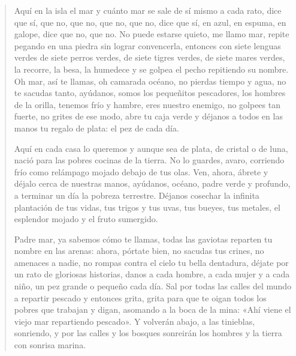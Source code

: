 \documentclass[12pt]{article}
\begin{document}
\clearpage
{}
\begin{verse}
Aquí en la isla  
el mar  
y cuánto mar  
se sale de sí mismo  
a cada rato,  
dice que sí, que no,  
que no, que no, que no,  
dice que sí, en azul,  
en espuma, en galope,  
dice que no, que no.  
No puede estarse quieto,  
me llamo mar, repite  
pegando en una piedra  
sin lograr convencerla,  
entonces  
con siete lenguas verdes  
de siete perros verdes,  
de siete tigres verdes,  
de siete mares verdes,  
la recorre, la besa,  
la humedece  
y se golpea el pecho  
repitiendo su nombre.  
Oh mar, así te llamas,  
oh camarada océano,  
no pierdas tiempo y agua,  
no te sacudas tanto,  
ayúdanos,  
somos los pequeñitos  
pescadores,  
los hombres de la orilla,  
tenemos frío y hambre,  
eres nuestro enemigo,  
no golpees tan fuerte,  
no grites de ese modo,  
abre tu caja verde  
y déjanos a todos  
en las manos  
tu regalo de plata:  
el pez de cada día.  

Aquí en cada casa  
lo queremos  
y aunque sea de plata,  
de cristal o de luna,  
nació para las pobres  
cocinas de la tierra.  
No lo guardes,  
avaro,  
corriendo frío como  
relámpago mojado  
debajo de tus olas.  
Ven, ahora,  
ábrete  
y déjalo  
cerca de nuestras manos,  
ayúdanos, océano,  
padre verde y profundo,  
a terminar un día  
la pobreza terrestre.  
Déjanos  
cosechar la infinita  
plantación de tus vidas,  
tus trigos y tus uvas,  
tus bueyes, tus metales,  
el esplendor mojado  
y el fruto sumergido.  

Padre mar, ya sabemos  
cómo te llamas, todas  
las gaviotas reparten  
tu nombre en las arenas:  
ahora, pórtate bien,  
no sacudas tus crines,  
no amenaces a nadie,  
no rompas contra el cielo  
tu bella dentadura,  
déjate por un rato  
de gloriosas historias,  
danos a cada hombre,  
a cada  
mujer y a cada niño,  
un pez grande o pequeño  
cada día.  
Sal por todas las calles  
del mundo  
a repartir pescado  
y entonces  
grita,  
grita  
para que te oigan todos  
los pobres que trabajan  
y digan,  
asomando a la boca  
de la mina:  
«Ahí viene el viejo mar  
repartiendo pescado».  
Y volverán abajo,  
a las tinieblas,  
sonriendo, y por las calles  
y los bosques  
sonreirán los hombres  
y la tierra  
con sonrisa marina.  


\end{verse}
\end{document}
